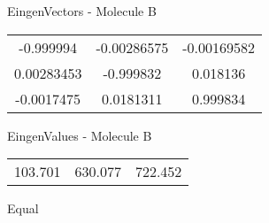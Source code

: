 \begin{multicols}{2}
\begin{center}
\vtab
 EingenVectors - Molecule B     \\
\vtab
\begin{tabular}{|c c c|}
-0.999994	 & 	-0.00286575	 & 	-0.00169582	 \\
0.00283453	 & 	-0.999832	 & 	0.018136	 \\
-0.0017475	 & 	0.0181311	 & 	0.999834
\end{tabular}

\vtab
 EingenValues - Molecule B     \\
\vtab
\begin{tabular}{|c c c|}
103.701	 & 	630.077	 & 	722.452	 \\
\end{tabular}

\end{center}
\end{multicols}
\begin{center}
\vtab
\vtab
\textcolor{NavyBlue}{\Large Equal}
\end{center}

 \newpage

